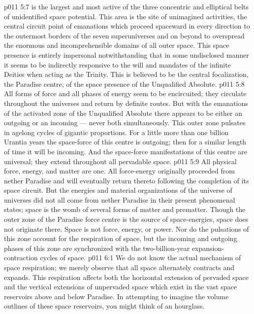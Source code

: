 \vs p011 5:7 \pc {} is the largest and most active of the three concentric and elliptical belts of unidentified space potential. This area is the site of unimagined activities, the central circuit point of emanations which proceed spaceward in every direction to the outermost borders of the seven superuniverses and on beyond to overspread the enormous and incomprehensible domains of all outer space. This space presence is entirely impersonal notwithstanding that in some undisclosed manner it seems to be indirectly responsive to the will and mandates of the infinite Deities when acting as the Trinity. This is believed to be the central focalization, the Paradise centre, of the space presence of the Unqualified Absolute.
\vs p011 5:8 All forms of force and all phases of energy seem to be encircuited; they circulate throughout the universes and return by definite routes. But with the emanations of the activated zone of the Unqualified Absolute there appears to be either an outgoing or an incoming --- never both simultaneously. This outer zone pulsates in agelong cycles of gigantic proportions. For a little more than one billion Urantia years the space\hyp{}force of this centre is outgoing; then for a similar length of time it will be incoming. And the space\hyp{}force manifestations of this centre are universal; they extend throughout all pervadable space.
\vs p011 5:9 \pc All physical force, energy, and matter are one. All force\hyp{}energy originally proceeded from nether Paradise and will eventually return thereto following the completion of its space circuit. But the energies and material organizations of the universe of universes did not all come from nether Paradise in their present phenomenal states; space is the womb of several forms of matter and prematter. Though the outer zone of the Paradise force centre is the source of space\hyp{}energies, space does not originate there. Space is not force, energy, or power. Nor do the pulsations of this zone account for the respiration of space, but the incoming and outgoing phases of this zone are synchronized with the two\hyp{}billion\hyp{}year expansion\hyp{}contraction cycles of space.
\vs p011 6:1 We do not know the actual mechanism of space respiration; we merely observe that all space alternately contracts and expands. This respiration affects both the horizontal extension of pervaded space and the vertical extensions of unpervaded space which exist in the vast space reservoirs above and below Paradise. In attempting to imagine the volume outlines of these space reservoirs, you might think of an hourglass.
